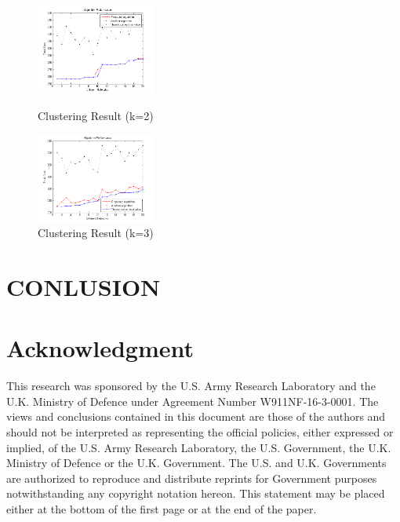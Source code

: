 \documentclass[conference]{IEEEtran}
\begin{document}
\begin{figure}[htbp]
  \centering
  \includegraphics[width=0.35\textwidth]{figures/k2}
  \caption{Clustering Result (k=2)}\label{fig:digit}
  \includegraphics[width=0.35\textwidth]{figures/k3}
  \caption{Clustering Result (k=3)}\label{fig:digit}
\end{figure}

\section{CONLUSION}

\section*{Acknowledgment}
This research was sponsored by the U.S. Army Research Laboratory and the U.K. Ministry of Defence under Agreement Number W911NF-16-3-0001. The views and conclusions contained in this document are those of the authors and should not be interpreted as representing the official policies, either expressed or implied, of the U.S. Army Research Laboratory, the U.S. Government, the U.K. Ministry of Defence or the U.K. Government. The U.S. and U.K. Governments are authorized to reproduce and distribute reprints for Government purposes notwithstanding any copyright notation hereon. This statement may be placed either at the bottom of the first page or at the end of the paper.

\end{document}
